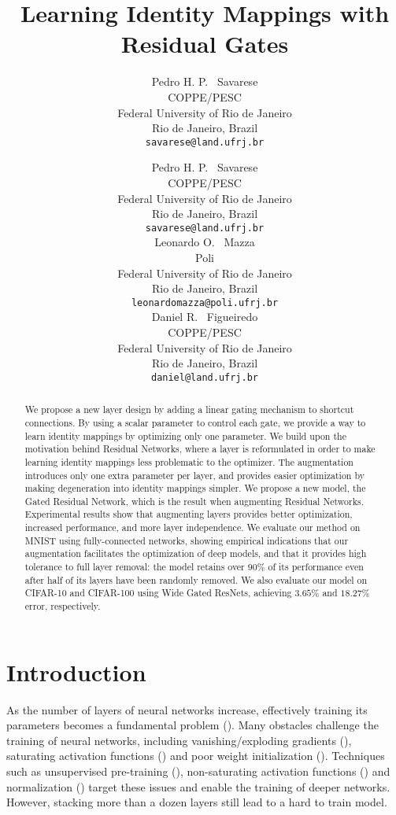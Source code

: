 \documentclass{article} %
\title{Learning Identity Mappings with Residual Gates}
\author{Pedro H. P. ~Savarese\\
COPPE/PESC\\
Federal University of Rio de Janeiro\\
Rio de Janeiro, Brazil \\
\texttt{savarese@land.ufrj.br} \\
}
\author{Pedro H. P. ~Savarese \\
COPPE/PESC\\
Federal University of Rio de Janeiro\\
Rio de Janeiro, Brazil  \\
\texttt{savarese@land.ufrj.br} \\
\And
Leonardo O. ~Mazza \\
Poli \\
Federal University of Rio de Janeiro \\
Rio de Janeiro, Brazil \\
\texttt{leonardomazza@poli.ufrj.br} \\
\And
Daniel R. ~Figueiredo \\
COPPE/PESC \\
Federal University of Rio de Janeiro \\
Rio de Janeiro, Brazil \\
\texttt{daniel@land.ufrj.br} \\
}
\begin{document}
\maketitle

\begin{abstract}


We propose a new layer design by adding a linear gating mechanism to shortcut connections. By using a scalar parameter to control each gate, we provide a way to learn identity mappings by optimizing only one parameter. We build upon the motivation behind Residual Networks, where a layer is reformulated in order to make learning identity mappings less problematic to the optimizer. The augmentation introduces only one extra parameter per layer, and provides easier optimization by making degeneration into identity mappings simpler. We propose a new model, the Gated Residual Network, which is the result when augmenting Residual Networks. Experimental results show that augmenting layers provides better optimization, increased performance, and more layer independence. We evaluate our method on MNIST using fully-connected networks, showing empirical indications that our augmentation facilitates the optimization of deep models, and that it provides high tolerance to full layer removal: the model retains over $90 \%$ of its performance even after half of its layers have been randomly removed. We also evaluate our model on CIFAR-10 and CIFAR-100 using Wide Gated ResNets, achieving $3.65 \%$ and $18.27 \%$ error, respectively.


\end{abstract}












\section{Introduction}
\label{introduction}



As the number of layers of neural networks increase, effectively training its parameters becomes a fundamental problem (\cite{deephard}). Many obstacles challenge the training of neural networks, including vanishing/exploding gradients (\cite{hardtrain}), saturating activation functions (\cite{saturation}) and poor weight initialization (\cite{glorot}). Techniques such as unsupervised pre-training (\cite{aes}), non-saturating activation functions (\cite{relu}) and normalization (\cite{bn}) target these issues and enable the training of deeper networks. However, stacking more than a dozen layers still lead to a hard to train model. 
\end{document}
